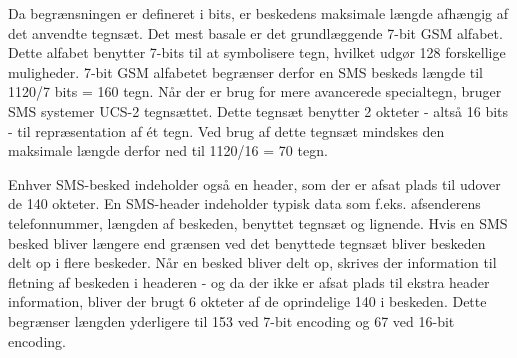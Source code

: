 Da begrænsningen er defineret i bits, er beskedens maksimale længde afhængig af det anvendte tegnsæt. Det mest basale er det grundlæggende 7-bit GSM alfabet. Dette alfabet benytter 7-bits til at symbolisere tegn, hvilket udgør 128 forskellige muligheder. 7-bit GSM alfabetet begrænser derfor en SMS beskeds længde til 1120/7 bits = 160 tegn. Når der er brug for mere avancerede specialtegn, bruger SMS systemer UCS-2 tegnsættet. Dette tegnsæt benytter 2 okteter - altså 16 bits - til repræsentation af ét tegn. Ved brug af dette tegnsæt mindskes den maksimale længde derfor ned til 1120/16 = 70 tegn. \cite{sms_pdu}

Enhver SMS-besked indeholder også en header\cite{sms_pdu}, som der er afsat plads til udover de 140 okteter. En SMS-header indeholder typisk data som f.eks. afsenderens telefonnummer, længden af beskeden, benyttet tegnsæt og lignende. Hvis en SMS besked bliver længere end grænsen ved det benyttede tegnsæt bliver beskeden delt op i flere beskeder. Når en besked bliver delt op, skrives der information til fletning af beskeden i headeren - og da der ikke er afsat plads til ekstra header information, bliver der brugt 6 okteter af de oprindelige 140 i beskeden. Dette begrænser længden yderligere til 153 ved 7-bit encoding og 67 ved 16-bit encoding. 